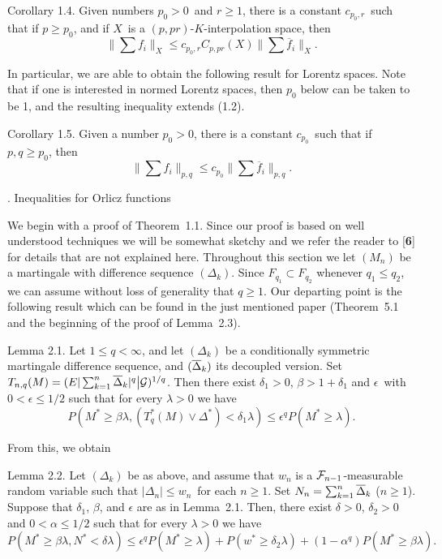 \proclaim Corollary 1.4. Given numbers $p_0>0$\ and $r\ge 1$,
there is a constant $c_{p_0,r}$\ such that if $p \ge p_0$, and if $X$\ is a
$(p,pr)$-$K$-interpolation space, then $$ \|\sum f_i\|_X \leq c_{p_0,r}
C_{p,pr}(X) \|\sum\overline f_i\|_X.$$

In particular, we are able to obtain the following result for  Lorentz
spaces.  Note that if one is interested in normed Lorentz
spaces, then $p_0$ below can be taken to be 1, and
the resulting inequality extends (1.2).

\proclaim Corollary 1.5. Given a number $p_0>0$, there is a constant
$c_{p_0}$\ such that if $p,q \ge p_0$, then $$ \|\sum f_i\|_{p,q} \leq
c_{p_0}
\|\sum\overline f_i\|_{p,q}.$$

. Inequalities for Orlicz functions 

We begin with a proof of Theorem~1.1. Since our proof is based on 
well understood techniques we will be somewhat sketchy and we refer the
reader to [{\bf 6}] for details that are not explained here.
Throughout this section we let $(M_n)$ be a martingale with difference
sequence $(\Delta_k)$. Since $F_{q_1}\subset F_{q_2}$ whenever $q_1\le
q_2$, we can assume without loss of generality that $q\ge 1$. Our
departing point is the following result which can be found in the just
mentioned paper (Theorem~5.1 and the beginning of the proof of
Lemma~2.3). 

\proclaim Lemma 2.1. Let $1\le q<\infty$, and let $(\Delta_k)$ be a
conditionally symmetric martingale difference sequence, and $(\overline{\Delta
}_k)$ its decoupled version. Set $T_{n,q}(M)=(E|\sum_{k=1}^n\overline
{\Delta}_k|^q\big|{\cal G})^{1/q}$. Then there exist $\delta_1>0$,
$\beta>1+\delta_1$ and $\epsilon$\ with
$0<\epsilon\le 1/2$ such that for every
$\lambda>0$ we have
$$ P(M^*\geq \beta\lambda, (T_q^*(M)\vee \Delta^*)<\delta_1\lambda) \leq
\epsilon^qP(M^*\ge\lambda). $$

\noindent From this, we obtain

\proclaim Lemma 2.2. Let
$(\Delta_k)$ be as above, and assume that $w_n$ is a ${\cal
F}_{n-1}$-measurable random variable such that $|\Delta_n|\le w_n$\ 
for each $n \ge 1$.
Set $N_n=\sum_{k=1}^n\overline {\Delta}_k$ ($n\ge 1$). Suppose that
$\delta_1$, $\beta$, and $\epsilon$ are as in Lemma~2.1. Then, there
exist $\delta>0$, $\delta_2>0$ and $0<\alpha\le 1/2$ such that for every
$\lambda>0$ we have $$ P(M^*\geq \beta\lambda, N^*<\delta\lambda) \leq
\epsilon^qP(M^*\ge\lambda) +P(w^*\ge\delta_2\lambda) +
(1-\alpha^q)P(M^*\geq \beta\lambda). $$

